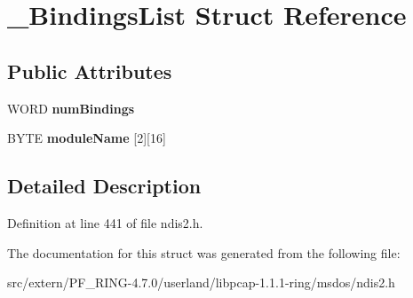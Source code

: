 \hypertarget{struct___bindings_list}{
\section{\_\-BindingsList Struct Reference}
\label{struct___bindings_list}
}
\subsection*{Public Attributes}
\begin{DoxyCompactItemize}
\item 
\hypertarget{struct___bindings_list_a0964e0a8027e714b36801dc55b0d1294}{
WORD {\bfseries numBindings}}
\label{struct___bindings_list_a0964e0a8027e714b36801dc55b0d1294}

\item 
\hypertarget{struct___bindings_list_a34645d73947cd91dbe5f12731da78740}{
BYTE {\bfseries moduleName} \mbox{[}2\mbox{]}\mbox{[}16\mbox{]}}
\label{struct___bindings_list_a34645d73947cd91dbe5f12731da78740}

\end{DoxyCompactItemize}


\subsection{Detailed Description}


Definition at line 441 of file ndis2.h.



The documentation for this struct was generated from the following file:\begin{DoxyCompactItemize}
\item 
src/extern/PF\_\-RING-\/4.7.0/userland/libpcap-\/1.1.1-\/ring/msdos/ndis2.h\end{DoxyCompactItemize}
